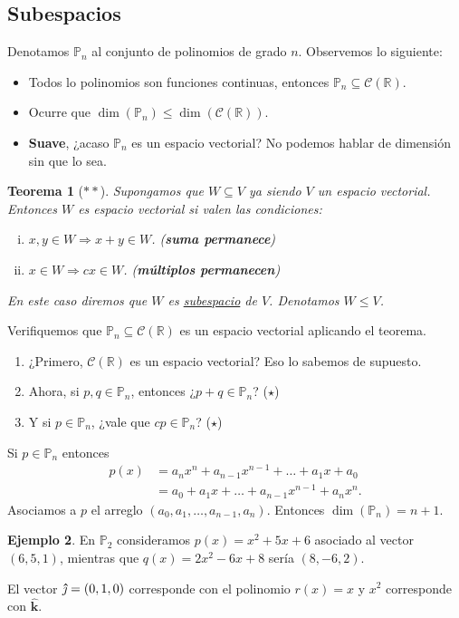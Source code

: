 \documentclass[12pt]{article}
\theoremstyle{plain}
\newtheorem{Th}{Teorema}  %
\theoremstyle{definition}
\newtheorem{Ex}[Th]{Ejemplo}           %
\theoremstyle{remark}
\newcommand{\thickhat}[1]{\mathbf{\hat{\text{$#1$}}}}
\newcommand{\jj}{\vu{\jmath}}
\newcommand{\kk}{\thickhat{k}}
\newcommand{\bP}{\mathbb{P}}        %
\newcommand{\bR}{\mathbb{R}}        %
\newcommand{\cC}{\mathcal{C}}       %
\renewcommand{\leq}{\leqslant}      %
\renewcommand{\:}{\colon}           %
\newcommand{\un}[1]{\underline{#1}}
\renewcommand{\.}{\Cdot}                %
\newcommand{\To}{\Rightarrow}
\begin{document}
\begin{multicols}{2}
\subsection*{Subespacios}

Denotamos $\bP_n$ al conjunto de polinomios de grado $n$. Observemos lo siguiente:

\begin{itemize}
  \itemsep=-0.4em
  \item Todos lo polinomios son funciones continuas, entonces $\bP_n\subseteq \cC(\bR)$.
  \item Ocurre que $\dim(\bP_n)\leq \dim(\cC(\bR))$.
  \item \textbf{Suave}, ¿acaso $\bP_n$ es un espacio vectorial? No podemos hablar de dimensión sin que lo sea.
\end{itemize}

\begin{Th}[$\ast\ast$]
Supongamos que $W\subseteq V$ ya siendo $V$ un espacio vectorial. Entonces $W$ es espacio vectorial si valen las condiciones:
\begin{enumerate}[i)]
  \itemsep=-0.4em 
  \item $x,y\in W\To x+y\in W$. (\textbf{suma permanece})
  \item $x\in W\To cx\in W$. (\textbf{múltiplos permanecen})
\end{enumerate}
En este caso diremos que $W$ es \un{subespacio} de $V$. Denotamos $W\leq V$.
\end{Th}

Verifiquemos que $\bP_n\subseteq\cC(\bR)$ es un espacio vectorial aplicando el teorema. 
\begin{enumerate}
  \itemsep=-0.4em
  \item ¿Primero, $\cC(\bR)$ es un espacio vectorial? Eso lo sabemos de supuesto.
  \item Ahora, si $p,q\in\bP_n$, entonces ¿$p+q\in\bP_n$? ($\star$)
  \item Y si $p\in\bP_n$, ¿vale que $cp\in\bP_n$? ($\star$)
\end{enumerate}

Si $p\in\bP_n$ entonces 
\begin{align*}
  p(x)&=a_nx^n+a_{n-1}x^{n-1}+\dots+a_1x+a_0\\
  &=a_0+a_1x+\dots+a_{n-1}x^{n-1}+a_nx^n.
\end{align*}
Asociamos a $p$ el arreglo $(a_0,a_1,\dots,a_{n-1},a_n)$. Entonces $\dim(\bP_n)=n+1$. 

\begin{Ex}
  En $\bP_2$ consideramos $p(x)=x^2+5x+6$ asociado al vector $(6,5,1)$, mientras que $q(x)=2x^2-6x+8$ sería $(8,-6,2)$.\par 
  El vector $\jj=(0,1,0)$ corresponde con el polinomio $r(x)=x$ y $x^2$ corresponde con $\kk$.
\end{Ex}


\end{multicols}
\end{document}
